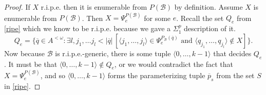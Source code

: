 \documentclass[11pt]{amsart}
\newcommand{\A}{{\mathcal{A}}}
\newcommand{\B}{{\mathcal{B}}}
\renewcommand{\bar}[1]{\overline{#1}}
\begin{document}
\begin{proof}
    If $X$ r.i.p.e. then it is enumerable from $P(\B)$ by definition. Assume $X$ is enumerable from $P(\B)$. Then $X = \Psi^{P(\B)}_e$ for some $e$. Recall the set $Q_e$ from \cref{ripe} which we know to be r.i.p.e. because we gave a $\Sigma_1^p$ description of it.
    \begin{equation*}
    Q_e = \{ \overline{q} \in A^{< \omega} : \exists l, j_1 ,\dots j_l < |\overline{q}| \, [\langle j_1,\dots, j_l \rangle \in \Psi_e^{P_\B(\overline{q})} \text{ and } \langle q_{j_1},\dots, q_{j_l} \rangle \not \in X] \}.
    \end{equation*}
    Now because $\B$ is r.i.p.e.-generic, there is some tuple $\langle 0,\dots ,k-1 \rangle$ that decides $Q_e$. It must be that $\langle 0,\dots ,k-1 \rangle \not \in Q_e$, or we would contradict the fact that $X = \Psi^{P(\B)}_e$, and so $\langle 0,\dots ,k-1 \rangle$ forms the parameterizing tuple $\bar p_s$ from the set $S$ in \cref{ripe}.
\end{proof}


\end{document}
